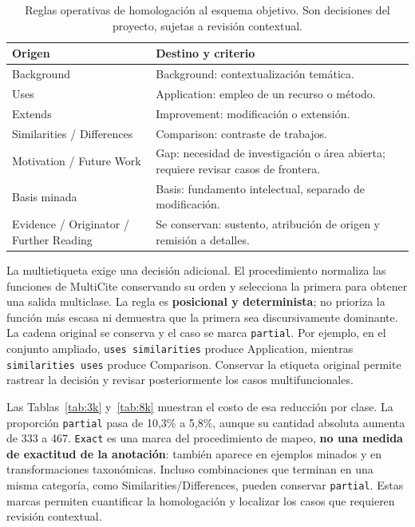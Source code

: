 \documentclass[10pt,a4paper,twocolumn]{article}
\begin{document}
\begin{table}[t]
\centering\small
\caption{Reglas operativas de homologación al esquema objetivo. Son decisiones del proyecto, sujetas a revisión contextual.}\label{tab:mapeo}
\begin{tabularx}{\columnwidth}{@{}p{2.7cm}Y@{}}\toprule
Origen & Destino y criterio\\\midrule
Background & Background: contextualización temática.\\
Uses & Application: empleo de un recurso o método.\\
Extends & Improvement: modificación o extensión.\\
Similarities / Differences & Comparison: contraste de trabajos.\\
Motivation / Future Work & Gap: necesidad de investigación o área abierta; requiere revisar casos de frontera.\\
Basis minada & Basis: fundamento intelectual, separado de modificación.\\
Evidence / Originator / Further Reading & Se conservan: sustento, atribución de origen y remisión a detalles.\\\bottomrule
\end{tabularx}
\end{table}

La multietiqueta exige una decisión adicional. El procedimiento normaliza las funciones de MultiCite conservando su orden y selecciona la primera para obtener una salida multiclase. La regla es \textbf{posicional y determinista}; no prioriza la función más escasa ni demuestra que la primera sea discursivamente dominante. La cadena original se conserva y el caso se marca \texttt{partial}. Por ejemplo, en el conjunto ampliado, \texttt{uses similarities} produce Application, mientras \texttt{similarities uses} produce Comparison. Conservar la etiqueta original permite rastrear la decisión y revisar posteriormente los casos multifuncionales.

Las Tablas~\ref{tab:3k} y~\ref{tab:8k} muestran el costo de esa reducción por clase. La proporción \texttt{partial} pasa de 10,3\% a 5,8\%, aunque su cantidad absoluta aumenta de 333 a 467. \texttt{Exact} es una marca del procedimiento de mapeo, \textbf{no una medida de exactitud de la anotación}: también aparece en ejemplos minados y en transformaciones taxonómicas. Incluso combinaciones que terminan en una misma categoría, como Similarities/Differences, pueden conservar \texttt{partial}. Estas marcas permiten cuantificar la homologación y localizar los casos que requieren revisión contextual.
\end{document}

